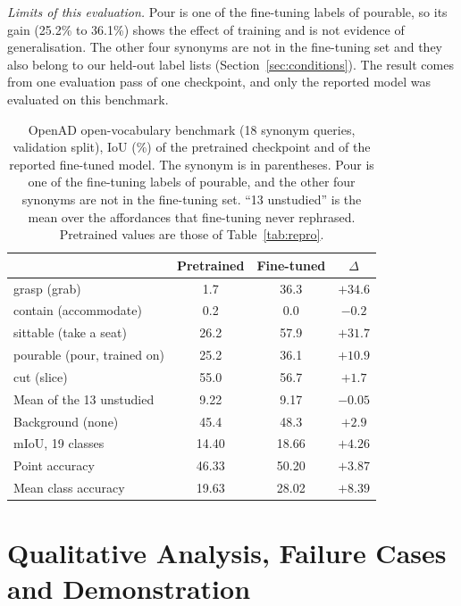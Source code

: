 \documentclass[conference]{IEEEtran}
\begin{document}
\emph{Limits of this evaluation.} Pour is one of the fine-tuning labels of pourable, so its gain (25.2\% to 36.1\%) shows the effect of training and is not evidence of generalisation. The other four synonyms are not in the fine-tuning set and they also belong to our held-out label lists (Section~\ref{sec:conditions}). The result comes from one evaluation pass of one checkpoint, and only the reported model was evaluated on this benchmark.

\begin{table}[t]
\caption{OpenAD open-vocabulary benchmark (18 synonym queries, validation split), IoU (\%) of the pretrained checkpoint and of the reported fine-tuned model. The synonym is in parentheses. Pour is one of the fine-tuning labels of pourable, and the other four synonyms are not in the fine-tuning set. ``13 unstudied'' is the mean over the affordances that fine-tuning never rephrased. Pretrained values are those of Table~\ref{tab:repro}.}
\label{tab:ov}
\centering
\small
\begin{tabular}{@{}lccc@{}}
\toprule
 & Pretrained & Fine-tuned & $\Delta$ \\
\midrule
grasp (grab)                 & 1.7  & 36.3 & $+34.6$ \\
contain (accommodate)        & 0.2  & 0.0  & $-0.2$ \\
sittable (take a seat)       & 26.2 & 57.9 & $+31.7$ \\
pourable (pour, trained on)  & 25.2 & 36.1 & $+10.9$ \\
cut (slice)                  & 55.0 & 56.7 & $+1.7$ \\
\midrule
Mean of the 13 unstudied     & 9.22 & 9.17 & $-0.05$ \\
Background (none)            & 45.4 & 48.3 & $+2.9$ \\
\midrule
mIoU, 19 classes             & 14.40 & 18.66 & $+4.26$ \\
Point accuracy               & 46.33 & 50.20 & $+3.87$ \\
Mean class accuracy          & 19.63 & 28.02 & $+8.39$ \\
\bottomrule
\end{tabular}
\end{table}

\section{Qualitative Analysis, Failure Cases and Demonstration}
\label{sec:qual}
\end{document}
